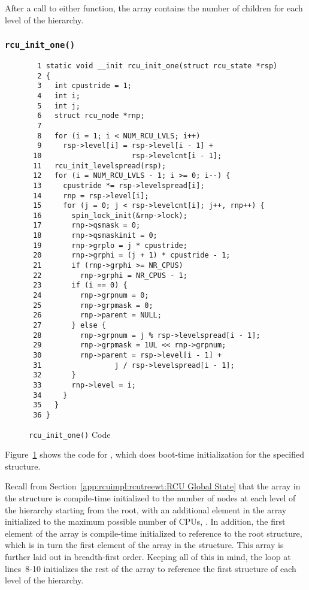 After a call to either function, the  array contains
the number of children for each level of the  hierarchy.

\subsubsection{\tt rcu\_init\_one()}
\label{app:rcuimpl:rcutreewt:rcu-init-one}

\begin{figure}[tbp]
{ \scriptsize
\begin{verbatim}
  1 static void __init rcu_init_one(struct rcu_state *rsp)
  2 {
  3   int cpustride = 1;
  4   int i;
  5   int j;
  6   struct rcu_node *rnp;
  7
  8   for (i = 1; i < NUM_RCU_LVLS; i++)
  9     rsp->level[i] = rsp->level[i - 1] +
 10                     rsp->levelcnt[i - 1];
 11   rcu_init_levelspread(rsp);
 12   for (i = NUM_RCU_LVLS - 1; i >= 0; i--) {
 13     cpustride *= rsp->levelspread[i];
 14     rnp = rsp->level[i];
 15     for (j = 0; j < rsp->levelcnt[i]; j++, rnp++) {
 16       spin_lock_init(&rnp->lock);
 17       rnp->qsmask = 0;
 18       rnp->qsmaskinit = 0;
 19       rnp->grplo = j * cpustride;
 20       rnp->grphi = (j + 1) * cpustride - 1;
 21       if (rnp->grphi >= NR_CPUS)
 22         rnp->grphi = NR_CPUS - 1;
 23       if (i == 0) {
 24         rnp->grpnum = 0;
 25         rnp->grpmask = 0;
 26         rnp->parent = NULL;
 27       } else {
 28         rnp->grpnum = j % rsp->levelspread[i - 1];
 29         rnp->grpmask = 1UL << rnp->grpnum;
 30         rnp->parent = rsp->level[i - 1] +
 31                 j / rsp->levelspread[i - 1];
 32       }
 33       rnp->level = i;
 34     }
 35   }
 36 }
\end{verbatim}
}
\caption{{\tt rcu\_init\_one()} Code}
\label{fig:app:rcuimpl:rcutreewt:Code for rcu-init-one}
\end{figure}

Figure~\ref{fig:app:rcuimpl:rcutreewt:Code for rcu-init-one}
shows the code for , which does boot-time initialization
for the specified
 structure.

Recall from
Section~\ref{app:rcuimpl:rcutreewt:RCU Global State}
that the  array in the  structure
is compile-time initialized to the number of nodes at each level of
the hierarchy starting from the root,
with an additional element in the array initialized
to the maximum possible number of CPUs, .
In addition, the first element of the  array is compile-time
initialized to reference to the root  structure, which is
in turn
the first element of the  array in the  structure.
This array is further laid out in breadth-first order.
Keeping all of this in mind, the loop at lines~8-10 initializes the rest
of the  array to reference the first  structure
of each level of the  hierarchy.

